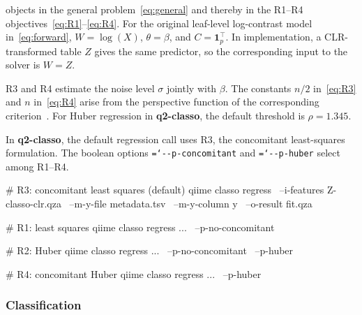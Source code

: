\documentclass[11pt,a4paper]{article}
\newcommand{\code}[1]{\allowbreak\texttt{\hyphenchar\font=`\-\relax #1}}
\newcommand{\pkg}[1]{\textbf{#1}}
\newcommand{\bbeta}{\beta}
\newcommand{\one}{\mathbf{1}}
\begin{document}
objects in the general problem~\eqref{eq:general} and thereby in the R1--R4
objectives~\eqref{eq:R1}--\eqref{eq:R4}.
For the original leaf-level log-contrast model in~\eqref{eq:forward},
$W=\log(X)$, $\theta=\bbeta$, and $C=\one_p^\top$. In implementation, a
CLR-transformed table $Z$ gives the same predictor, so the corresponding input
to the solver is $W=Z$.

R3 and R4 estimate the noise level $\sigma$ jointly with $\bbeta$. The constants
$n/2$ in~\eqref{eq:R3} and $n$ in~\eqref{eq:R4} arise from the perspective
function of the corresponding criterion~\citep{combettes2018perspective,
combettes2020perspective}. For Huber regression in \pkg{q2-classo}, the default
threshold is $\rho=1.345$.

In \pkg{q2-classo}, the default regression call uses R3, the concomitant
least-squares formulation. The boolean options \code{-{}-p-concomitant} and
\code{-{}-p-huber} select among R1--R4.
\begin{PseudoCode}
# R3: concomitant least squares (default)
qiime classo regress \
    --i-features Z-classo-clr.qza \
    --m-y-file metadata.tsv \
    --m-y-column y \
    --o-result fit.qza

# R1: least squares
qiime classo regress ... \
    --p-no-concomitant

# R2: Huber
qiime classo regress ... \
    --p-no-concomitant \
    --p-huber

# R4: concomitant Huber
qiime classo regress ... \
    --p-huber
\end{PseudoCode}

\subsubsection{Classification}
\label{sec:classification}
\end{document}
